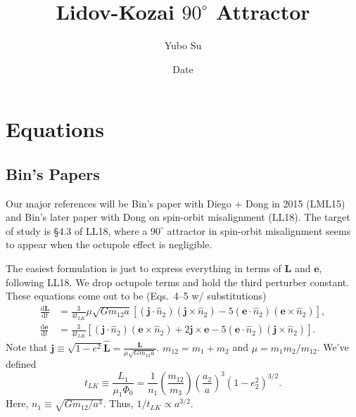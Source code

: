 \documentclass[11pt,
        usenames, %
        dvipsnames %
    ]{article}
\newcommand*{\rd}[2]{\frac{\mathrm{d}#1}{\mathrm{d}#2}}
\newcommand*{\bm}[1]{\boldsymbol{\mathbf{#1}}}
\newcommand*{\p}[1]{\left(#1\right)}
\newcommand*{\s}[1]{\left[#1\right]}
\begin{document}

\pagestyle{fancy}
\rhead{}
\cfoot{\thepage/\pageref{LastPage}}

\title{Lidov-Kozai $90^\circ$ Attractor}
\author{Yubo Su}
\date{Date}

\maketitle

\section{Equations}

\subsection{Bin's Papers}

Our major references will be Bin's paper with Diego + Dong in 2015 (LML15) and
Bin's later paper with Dong on spin-orbit misalignment (LL18). The target of
study is \S4.3 of LL18, where a $90^\circ$ attractor in spin-orbit misalignment
seems to appear when the octupole effect is negligible.

The easiest formulation is just to express everything in terms of $\bm{L}$ and
$\bm{e}$, following LL18. We drop octupole terms and hold the third perturber
constant. These equations come out to be (Eqs.~4--5 w/ substitutions)
\begin{align}
    \rd{\bm{L}}{t} &= \frac{3}{4t_{LK}} \mu \sqrt{Gm_{12}a} \s{
        \p{\bm{j} \cdot \hat{n}_2} \p{\bm{j} \times \hat{n}_2}
        - 5\p{\bm{e} \cdot \hat{n}_2}\p{\bm{e} \times \hat{n}_2}
        },\\
    \rd{\bm{e}}{t} &= \frac{3}{4t_{LK}} \s{
        \p{\bm{j} \cdot \hat{n}_2} \p{\bm{e} \times \hat{n}_2}
        + 2\bm{j} \times \bm{e}
        - 5\p{\bm{e} \cdot \hat{n}_2}\p{\bm{j} \times \hat{n}_2}
        }.
\end{align}
Note that $\bm{j} \equiv \sqrt{1 - e^2}\hat{\bm{L}} = \frac{\bm{L}}{\mu
\sqrt{Gm_{12}a}}$. $m_{12} = m_1 + m_2$ and $\mu = m_1m_2/m_{12}$. We've defined
\begin{equation}
    t_{LK} \equiv \frac{L_1}{\mu_1 \Phi_0}
        = \frac{1}{n_1}\p{\frac{m_{12}}{m_3}}
            \p{\frac{a_2}{a}}^3
            \p{1 - e_2^2}^{3/2}.
\end{equation}
Here, $n_1 \equiv \sqrt{Gm_{12}/a^3}$. Thus, $1 / t_{LK} \propto a^{3/2}$.
\end{document}
